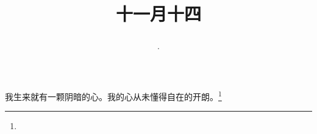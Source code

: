 \title{\date[d=14,m=12,y=2024][year:cn-y,年,month:cn,day:cn,日,·,weekday]·十一月十四 }
我生来就有一颗阴暗的心。我的心从未懂得自在的开朗。\footnote{ }

